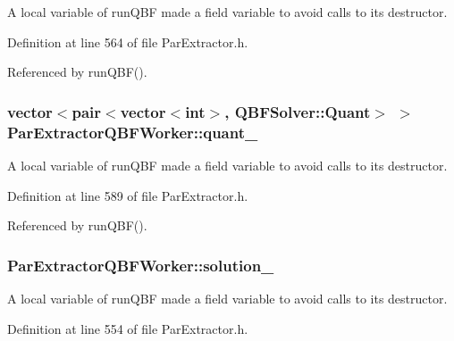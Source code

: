 A local variable of run\-Q\-B\-F made a field variable to avoid calls to its destructor. 



Definition at line 564 of file Par\-Extractor.\-h.



Referenced by run\-Q\-B\-F().

\hypertarget{classParExtractorQBFWorker_a6134568b687c7b2dcbd27e32eb91c431}{
\subsubsection[{quant\-\_\-}]{\setlength{\rightskip}{0pt plus 5cm}vector$<$pair$<$vector$<$int$>$, {\bf Q\-B\-F\-Solver\-::\-Quant}$>$ $>$ Par\-Extractor\-Q\-B\-F\-Worker\-::quant\-\_\-\hspace{0.3cm}{\ttfamily [protected]}}}\label{classParExtractorQBFWorker_a6134568b687c7b2dcbd27e32eb91c431}


A local variable of run\-Q\-B\-F made a field variable to avoid calls to its destructor. 



Definition at line 589 of file Par\-Extractor.\-h.



Referenced by run\-Q\-B\-F().

\hypertarget{classParExtractorQBFWorker_a61deac4da5bb39dfd73e81d8be25559e}{
\subsubsection[{solution\-\_\-}]{ Par\-Extractor\-Q\-B\-F\-Worker\-::solution\-\_\-\hspace{0.3cm}{\ttfamily [protected]}}}\label{classParExtractorQBFWorker_a61deac4da5bb39dfd73e81d8be25559e}


A local variable of run\-Q\-B\-F made a field variable to avoid calls to its destructor. 



Definition at line 554 of file Par\-Extractor.\-h.



